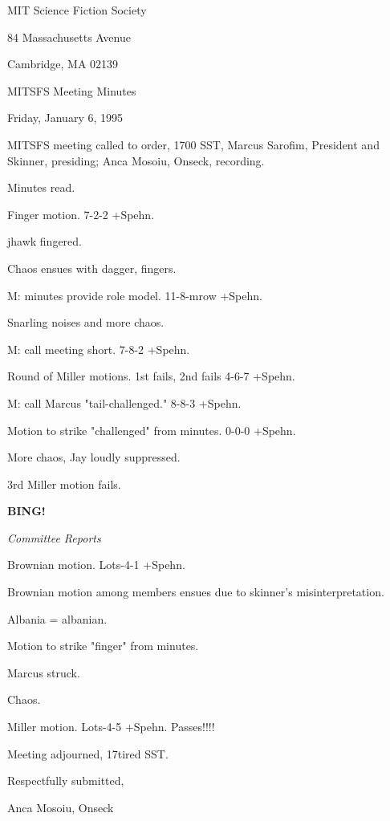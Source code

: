 \documentclass[12pt]{article}
\newcommand{\bing}{{\bf BING!} }
\newcommand{\goto}[1]{\bing \vskip 12pt \centerline{{\em{#1}}}}
\begin{document}
\begin{center}

MIT Science Fiction Society 

84 Massachusetts Avenue

Cambridge, MA 02139

\vspace{12pt}

MITSFS Meeting Minutes 

Friday, January 6, 1995

\end{center}
 
\vspace{18pt}

\setlength{\parskip}{6pt}

\noindent
MITSFS meeting called to order, 1700 SST,
Marcus Sarofim, President and Skinner, presiding; Anca Mosoiu, Onseck, recording.

Minutes read.

Finger motion. 7-2-2 +Spehn.

jhawk fingered.

Chaos ensues with dagger, fingers.

M: minutes provide role model. 11-8-mrow +Spehn.

Snarling noises and more chaos.

M: call meeting short. 7-8-2 +Spehn.

Round of Miller motions. 1st fails, 2nd fails 4-6-7 +Spehn.

M: call Marcus "tail-challenged." 8-8-3 +Spehn.

Motion to strike "challenged" from minutes. 0-0-0 +Spehn.

More chaos, Jay loudly suppressed.

3rd Miller motion fails.

\goto{Committee Reports}

Brownian motion. Lots-4-1 +Spehn.

Brownian motion among members ensues due to skinner's misinterpretation.

Albania = albanian.

Motion to strike "finger" from minutes.

Marcus struck.

Chaos.

Miller motion. Lots-4-5 +Spehn. Passes!!!!

\vspace{12pt}

\noindent
Meeting adjourned, 17tired SST.

\vspace{18pt}

\centerline{Respectfully submitted,}
\centerline{Anca Mosoiu, Onseck}
\end{document}
